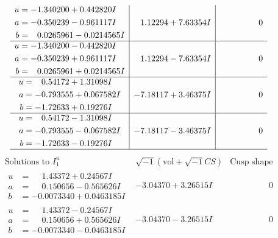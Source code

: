 \documentclass[1p]{elsarticle_modified}
\theoremstyle{definition}
\newcommand{\I}{\sqrt{-1}}
\begin{document}
$$\begin{array}{c|c|c}
\begin{aligned}
u &= -1.340200 + 0.442820 I \\
a &= -0.350239 - 0.961117 I \\
b &= \phantom{-}0.0265961 - 0.0214565 I\end{aligned}
 & \phantom{-}1.12294 + 7.63354 I & \phantom{-0.000000 } 0 \\ \hline\begin{aligned}
u &= -1.340200 - 0.442820 I \\
a &= -0.350239 + 0.961117 I \\
b &= \phantom{-}0.0265961 + 0.0214565 I\end{aligned}
 & \phantom{-}1.12294 - 7.63354 I & \phantom{-0.000000 } 0 \\ \hline\begin{aligned}
u &= \phantom{-}0.54172 + 1.31098 I \\
a &= -0.793555 + 0.067582 I \\
b &= -1.72633 + 0.19276 I\end{aligned}
 & -7.18117 + 3.46375 I & \phantom{-0.000000 } 0 \\ \hline\begin{aligned}
u &= \phantom{-}0.54172 - 1.31098 I \\
a &= -0.793555 - 0.067582 I \\
b &= -1.72633 - 0.19276 I\end{aligned}
 & -7.18117 - 3.46375 I & \phantom{-0.000000 } 0\\
 \hline 
 \end{array}$$\newpage$$\begin{array}{c|c|c}  
\text{Solutions to }I^u_{1}& \I (\text{vol} + \sqrt{-1}CS) & \text{Cusp shape}\\
 \hline 
\begin{aligned}
u &= \phantom{-}1.43372 + 0.24567 I \\
a &= \phantom{-}0.150656 - 0.565626 I \\
b &= -0.0073340 + 0.0463185 I\end{aligned}
 & -3.04370 + 3.26515 I & \phantom{-0.000000 } 0 \\ \hline\begin{aligned}
u &= \phantom{-}1.43372 - 0.24567 I \\
a &= \phantom{-}0.150656 + 0.565626 I \\
b &= -0.0073340 - 0.0463185 I\end{aligned}
 & -3.04370 - 3.26515 I & \phantom{-0.000000 } 0 \\ \hline\begin{aligned}

\end{aligned}
\end{array}$$
\end{document}

